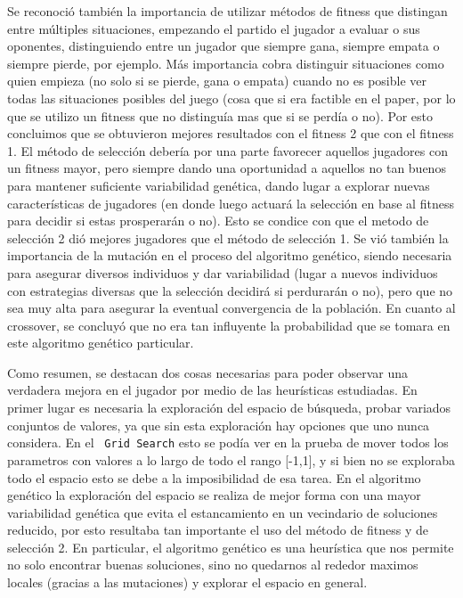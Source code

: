 \documentclass[A4paper,oneside,fleqn,11pt]{article}
\theoremstyle{definition}
\begin{document}
Se reconoció también la importancia de utilizar métodos de fitness que distingan entre múltiples situaciones, empezando el partido el jugador a evaluar o sus oponentes, distinguiendo entre un jugador que siempre gana, siempre empata o siempre pierde, por ejemplo. Más importancia cobra distinguir situaciones como quien empieza (no solo si se pierde, gana o empata) cuando no es posible ver todas las situaciones posibles del juego (cosa que si era factible en el paper, por lo que se utilizo un fitness que no distinguía mas que si se perdía o no). Por esto concluimos que se obtuvieron mejores resultados con el fitness 2 que con el fitness 1. El método de selección debería por una parte favorecer aquellos jugadores con un fitness mayor, pero siempre dando una oportunidad a aquellos no tan buenos para mantener suficiente variabilidad genética, dando lugar a explorar nuevas características de jugadores (en donde luego actuará la selección en base al fitness para decidir si estas prosperarán o no). Esto se condice con que el metodo de selección 2 dió mejores jugadores que el método de selección 1. Se vió también la importancia de la mutación en el proceso del algoritmo genético, siendo necesaria para asegurar diversos individuos y dar variabilidad (lugar a nuevos individuos con estrategias diversas que la selección decidirá si perdurarán o no), pero que no sea muy alta para asegurar la eventual convergencia de la población. En cuanto al crossover, se concluyó que no era tan influyente la probabilidad que se tomara en este algoritmo genético particular.

Como resumen, se destacan dos cosas necesarias para poder observar una verdadera mejora en el jugador por medio de las heurísticas estudiadas. En primer lugar es necesaria la exploración del espacio de búsqueda, probar variados conjuntos de valores, ya que sin esta exploración hay opciones que uno nunca considera. En el \texttt{ Grid Search} esto se podía ver en la prueba de mover todos los parametros con valores a lo largo de todo el rango [-1,1], y si bien no se exploraba todo el espacio esto se debe a la imposibilidad de esa tarea. En el algoritmo genético la exploración del espacio se realiza de mejor forma con una mayor variabilidad genética que evita el estancamiento en un vecindario de soluciones reducido, por esto resultaba tan importante el uso del método de fitness y de selección 2. En particular, el algoritmo genético es una heurística que nos permite no solo encontrar buenas soluciones, sino no quedarnos al rededor maximos locales (gracias a las mutaciones) y explorar el espacio en general.
\end{document}
